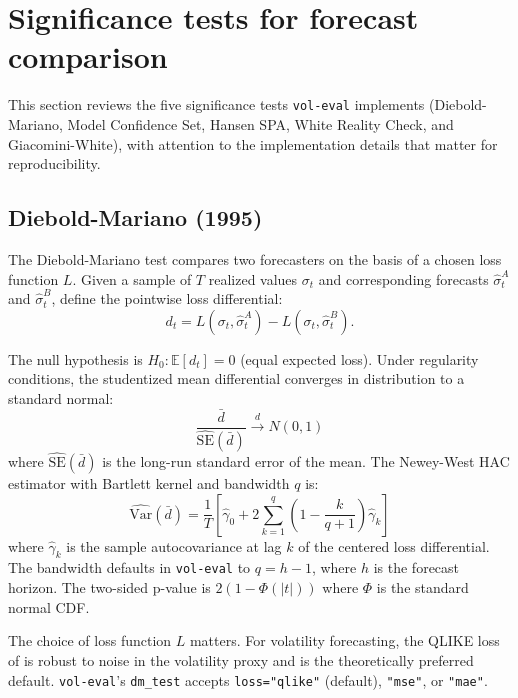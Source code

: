 \section{Significance tests for forecast comparison}\label{sec:methodology}

This section reviews the five significance tests \texttt{vol-eval} implements (Diebold-Mariano, Model Confidence Set, Hansen SPA, White Reality Check, and Giacomini-White), with attention to the implementation details that matter for reproducibility.

\subsection{Diebold-Mariano (1995)}

The Diebold-Mariano test compares two forecasters on the basis of a chosen loss function $L$. Given a sample of $T$ realized values $\sigma_t$ and corresponding forecasts $\hat\sigma^A_t$ and $\hat\sigma^B_t$, define the pointwise loss differential:
\begin{equation}
    d_t = L(\sigma_t, \hat\sigma^A_t) - L(\sigma_t, \hat\sigma^B_t).
\end{equation}

The null hypothesis is $H_0: \mathbb{E}[d_t] = 0$ (equal expected loss). Under regularity conditions, the studentized mean differential converges in distribution to a standard normal:
\begin{equation}
    \frac{\bar d}{\widehat{\text{SE}}(\bar d)} \xrightarrow{d} N(0, 1)
\end{equation}
where $\widehat{\text{SE}}(\bar d)$ is the long-run standard error of the mean. The Newey-West HAC estimator with Bartlett kernel and bandwidth $q$ is:
\begin{equation}
    \widehat{\text{Var}}(\bar d) = \frac{1}{T}\left[ \widehat\gamma_0 + 2 \sum_{k=1}^{q} \left(1 - \frac{k}{q+1}\right) \widehat\gamma_k \right]
\end{equation}
where $\widehat\gamma_k$ is the sample autocovariance at lag $k$ of the centered loss differential. The bandwidth defaults in \texttt{vol-eval} to $q = h - 1$, where $h$ is the forecast horizon. The two-sided p-value is $2(1 - \Phi(|t|))$ where $\Phi$ is the standard normal CDF.

The choice of loss function $L$ matters. For volatility forecasting, the QLIKE loss of \citet{Patton2011} is robust to noise in the volatility proxy and is the theoretically preferred default. \texttt{vol-eval}'s \texttt{dm\_test} accepts \texttt{loss="qlike"} (default), \texttt{"mse"}, or \texttt{"mae"}.

